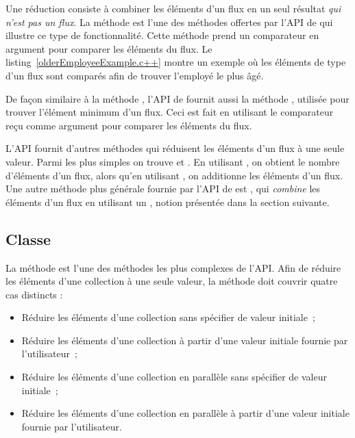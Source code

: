 Une r\'eduction
consiste \`a combiner les \'el\'ements d'un flux en un seul r\'esultat \emph{qui n'est pas un flux}. La m\'ethode   est l'une des m\'ethodes offertes par l'{API} de  qui illustre ce type de fonctionnalit\'e. Cette m\'ethode prend un comparateur en argument pour comparer les \'el\'ements du flux. 
%
Le listing~\ref{olderEmployeeExample.c++} montre un exemple o\`u les \'el\'ements de type  d'un flux sont compar\'es afin de trouver l'employ\'e le plus \^ag\'e.


De façon similaire \`a la m\'ethode , l’API de  fournit aussi la m\'ethode , utilis\'ee pour trouver l'\'el\'ement minimum d'un flux. Ceci est fait en utilisant le comparateur re\c{c}u comme argument pour comparer les \'el\'ements du flux.

L'{API} fournit d'autres m\'ethodes qui r\'eduisent les \'el\'ements d'un flux \`a une seule valeur. Parmi les plus simples on trouve  et . En utilisant , on obtient le nombre d'\'el\'ements d'un flux, alors qu'en utilisant , on additionne les \'el\'ements d'un flux. Une autre m\'ethode plus g\'en\'erale fournie par l'{API} de  est , qui \emph{combine} les \'el\'ements d'un flux en utilisant un , notion pr\'esent\'ee dans la section suivante.


\subsection{Classe }

\label{reducer.sect}

La m\'ethode  est l'une des m\'ethodes les plus complexes de l'API. Afin de r\'eduire les \'el\'ements d'une collection \`a une seule valeur, la m\'ethode  doit couvrir quatre cas distincts : 

\begin{itemize}
\item R\'eduire les \'el\'ements d'une collection sans spécifier de valeur initiale~; 

\item R\'eduire les \'el\'ements d'une collection \`a partir d'une valeur initiale fournie par l'utilisateur~; 

\item R\'eduire les \'el\'ements d'une collection en parall\`ele sans spécifier de valeur initiale~; 

\item R\'eduire les \'el\'ements d'une collection en parall\`ele \`a partir d'une valeur initiale fournie par l'utilisateur.
\end{itemize}

